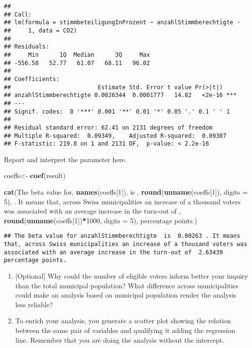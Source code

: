 \documentclass[
]{book}
\newenvironment{Shaded}{\begin{snugshade}}{\end{snugshade}}
\newcommand{\AttributeTok}[1]{\textcolor[rgb]{0.13,0.29,0.53}{#1}}
\newcommand{\DecValTok}[1]{\textcolor[rgb]{0.00,0.00,0.81}{#1}}
\newcommand{\FunctionTok}[1]{\textcolor[rgb]{0.13,0.29,0.53}{\textbf{#1}}}
\newcommand{\NormalTok}[1]{#1}
\newcommand{\OtherTok}[1]{\textcolor[rgb]{0.56,0.35,0.01}{#1}}
\newcommand{\SpecialCharTok}[1]{\textcolor[rgb]{0.81,0.36,0.00}{\textbf{#1}}}
\newcommand{\StringTok}[1]{\textcolor[rgb]{0.31,0.60,0.02}{#1}}
\begin{document}
\begin{verbatim}
## 
## Call:
## lm(formula = stimmbeteiligungInProzent ~ anzahlStimmberechtigte - 
##     1, data = CO2)
## 
## Residuals:
##     Min      1Q  Median      3Q     Max 
## -556.58   52.77   61.07   68.11   96.02 
## 
## Coefficients:
##                         Estimate Std. Error t value Pr(>|t|)    
## anzahlStimmberechtigte 0.0026344  0.0001777   14.82   <2e-16 ***
## ---
## Signif. codes:  0 '***' 0.001 '**' 0.01 '*' 0.05 '.' 0.1 ' ' 1
## 
## Residual standard error: 62.41 on 2131 degrees of freedom
## Multiple R-squared:  0.09349,    Adjusted R-squared:  0.09307 
## F-statistic: 219.8 on 1 and 2131 DF,  p-value: < 2.2e-16
\end{verbatim}

Report and interpret the parameter here.

\begin{Shaded}
\begin{Highlighting}[]
\NormalTok{coeffs}\OtherTok{\textless{}{-}} \FunctionTok{coef}\NormalTok{(result)}

\FunctionTok{cat}\NormalTok{(}\StringTok{\textquotesingle{}The beta value for\textquotesingle{}}\NormalTok{, }\FunctionTok{names}\NormalTok{(coeffs[}\DecValTok{1}\NormalTok{]), }\StringTok{\textquotesingle{} is \textquotesingle{}}\NormalTok{, }\FunctionTok{round}\NormalTok{(}\FunctionTok{unname}\NormalTok{(coeffs[}\DecValTok{1}\NormalTok{]), }\AttributeTok{digits =} \DecValTok{5}\NormalTok{), }\StringTok{\textquotesingle{}. It means that, across Swiss municipalities an increase of a thousand voters was associated with an average increase in the turn{-}out of \textquotesingle{}}\NormalTok{, }\FunctionTok{round}\NormalTok{(}\FunctionTok{unname}\NormalTok{(coeffs[}\DecValTok{1}\NormalTok{])}\SpecialCharTok{*}\DecValTok{1000}\NormalTok{, }\AttributeTok{digits =} \DecValTok{5}\NormalTok{), }\StringTok{\textquotesingle{} percentage points.\textquotesingle{}}\NormalTok{)}
\end{Highlighting}
\end{Shaded}

\begin{verbatim}
## The beta value for anzahlStimmberechtigte  is  0.00263 . It means that, across Swiss municipalities an increase of a thousand voters was associated with an average increase in the turn-out of  2.63439  percentage points.
\end{verbatim}

\begin{enumerate}
\def\labelenumi{\roman{enumi}.}
\item
  {[}Optional{]} Why could the number of eligible voters inform better your inquiry than the total municipal population? What difference across municipalities could make an analysis based on municipal population render the analysis less reliable?
\item
  To enrich your analysis, you generate a scatter plot showing the relation between the same pair of variables and qualifying it adding the regression line. Remember that you are doing the analysis without the intercept.
\end{enumerate}
\end{document}
